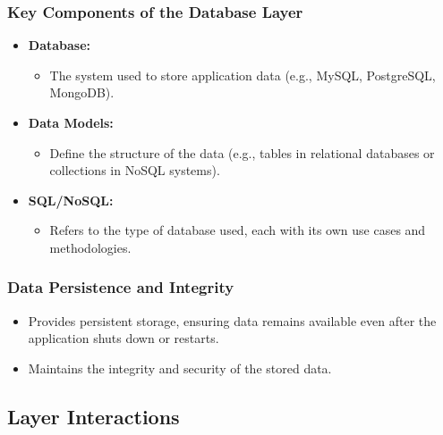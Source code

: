 \documentclass[aspectratio=169, table]{beamer}
\begin{document}
\begin{frame}
	\frametitle{Key Components of the Database Layer}
	\begin{itemize}
		\item \textbf{Database:}
		\begin{itemize}
			\item The system used to store application data (e.g., MySQL, PostgreSQL, MongoDB).
		\end{itemize}
		\item \textbf{Data Models:}
		\begin{itemize}
			\item Define the structure of the data (e.g., tables in relational databases or collections in NoSQL systems).
		\end{itemize}
		\item \textbf{SQL/NoSQL:}
		\begin{itemize}
			\item Refers to the type of database used, each with its own use cases and methodologies.
		\end{itemize}
	\end{itemize}
\end{frame}

\begin{frame}
	\frametitle{Data Persistence and Integrity}
	\begin{itemize}
		\item Provides persistent storage, ensuring data remains available even after the application shuts down or restarts.
		\item Maintains the integrity and security of the stored data.
	\end{itemize}
\end{frame}

\subsection{Layer Interactions}
\end{document}
